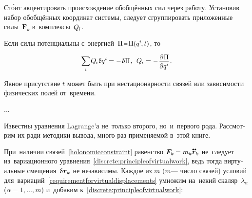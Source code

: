 \begin{otherlanguage}{russian}
\vspace{-0.15em}\noindent
Ст\'{о}ит акцентировать происхождение обобщённых сил через работу.
Установив набор обобщённых координат системы, следует сгруппировать приложенные силы~${\bm{F}_k}$ в~комплексы~${Q_{\hspace{-0.1ex}i}}$.

Если силы потенциальны с~энергией~${\potentialenergydensity \narroweq \potentialenergydensity (q^i \hspace{-0.2ex} , t)}$, то

\nopagebreak\vspace{-0.2em}\begin{equation}
\scalebox{0.92}[0.96]{$\displaystyle \sum_{i}$} \hspace{.16ex} Q_{\hspace{-0.1ex}i} \hspace{.12ex} \variation{q^i} \hspace{-0.1ex}
= - \hspace{.16ex} \variation{\potentialenergydensity} \hspace{.1ex} ,
\:\:
Q_{\hspace{-0.1ex}i} = - \hspace{.16ex} \scalebox{0.96}{$ \displaystyle \frac{\raisemath{-0.12em}{\partial \hspace{.1ex} \potentialenergydensity}}{\raisemath{-0.1em}{\partial q^i}} $} \hspace{.16ex} .
\vspace{-0.1em}\end{equation}

\vspace{-0.15em}\noindent
Явное присутствие $t$ может быть при нестационарности связей или зависимости физических полей от~времени.

...

Известны уравнения Lagrange’а не~только второго, но~и~первого рода.
Рассмотрим их ради методики вывода, много раз применяемой в~этой книге.

При~наличии связей~\eqref{holonomicconstraint} равенство ${\bm{F}_k \hspace{-0.12ex} = m_k \mathdotdotabove{\locationvector}_k}$ не~следует из~вариационного уравнения~\eqref{discrete:principleofvirtualwork}, ведь тогда виртуальные смещения~${\variation{\hspace{.1ex}\locationvector_k}}$ не независимы.
Каждое из $m$ ($m$\:--- число связей) условий для~вариаций~\eqref{requirementforvirtualdisplacements} умножим на~некий скаляр~$\lambda_{\alpha}$ (${\alpha = 1, \ldots, m}$) и~добавим к~\eqref{discrete:principleofvirtualwork}:


\end{otherlanguage}
